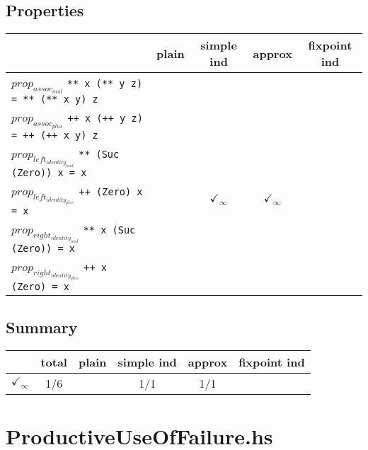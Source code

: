 \documentclass{article}
\begin{document}
\subsection*{Properties}
\begin{longtable}{p{10cm} || c | c | c | c | }
  & plain & simple ind & approx & fixpoint ind \\
\hline
$prop_{assoc_{mul}}$ \newline \verb`** x (** y z) = ** (** x y) z` &  &  &  &  \\
\hline
$prop_{assoc_{plus}}$ \newline \verb`++ x (++ y z) = ++ (++ x y) z` &  &  &  &  \\
\hline
$prop_{left_{identity_{mul}}}$ \newline \verb`** (Suc (Zero)) x = x` &  &  &  &  \\
\hline
$prop_{left_{identity_{plus}}}$ \newline \verb`++ (Zero) x = x` &  & $\checkmark_{\infty}$ & $\checkmark_{\infty}$ &  \\
\hline
$prop_{right_{identity_{mul}}}$ \newline \verb`** x (Suc (Zero)) = x` &  &  &  &  \\
\hline
$prop_{right_{identity_{plus}}}$ \newline \verb`++ x (Zero) = x` &  &  &  &  \\
\end{longtable}

\subsection*{Summary}
\begin{longtable}{p{4cm} || c | c | c | c | c | }
  & total & plain & simple ind & approx & fixpoint ind \\
\hline
$\checkmark_{\infty}$ & 1/6 &  & 1/1 & 1/1 & \\
\end{longtable}

\section*{ProductiveUseOfFailure.hs}
\end{document}
